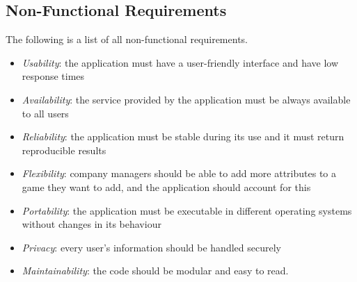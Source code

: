 \subsection{Non-Functional Requirements}
The following is a list of all non-functional requirements.
\begin{itemize}
	\item \emph{Usability}: the application must have a user-friendly interface and have low response times
	\item \emph{Availability}: the service provided by the application must be always available to all users
	\item \emph{Reliability}: the application must be stable during its use and it must return reproducible results
	\item \emph{Flexibility}: company managers should be able to add more attributes to a game they want to add, and the application should account for this
	\item \emph{Portability}: the application must be executable in different operating systems without changes in its behaviour
	\item \emph{Privacy}: every user's information should be handled securely
	\item \emph{Maintainability}: the code should be modular and easy to read.
\end{itemize}
